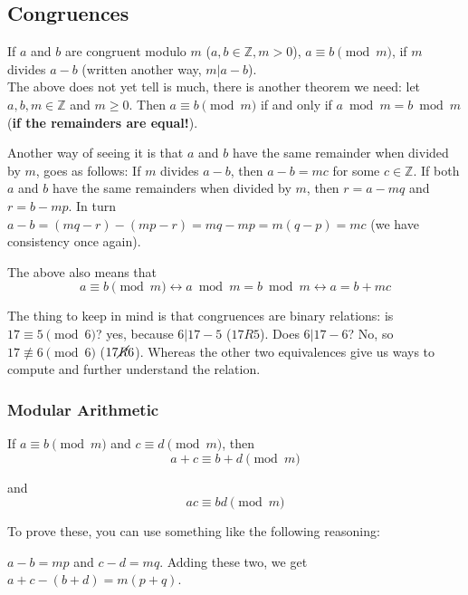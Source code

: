 \subsection{Congruences}

If $a$ and $b$ are congruent modulo $m$ ($a,b \in \mathbb{Z}, m >0$), $a \equiv b \pmod m$,
if $m$ divides $a-b$ (written another way, $m | a-b$).
\\

The above does not yet tell is much, there is another theorem we need:
let $a, b, m\in\mathbb{Z}$ and $m \geq 0$.
Then $a \equiv b \pmod m$ if and only if $a \bmod m = b \bmod m$
(\textbf{if the remainders are equal!}).

Another way of seeing it is that $a$ and $b$ have the same remainder when divided by $m$, goes as follows:
If $m$ divides $a-b$, then $a-b = mc$ for some $c \in\mathbb{Z}$.
If both $a$ and $b$ have the same remainders when divided by $m$, then
$r = a - mq$ and $r = b - mp$.
In turn $a-b = (mq - r) - (mp - r) = mq - mp = m(q-p) = mc$ (we have consistency once again).

The above also means that
$$
a \equiv b \pmod m  \leftrightarrow  a \bmod m = b \bmod m  \leftrightarrow  a = b + mc
$$

The thing to keep in mind is that congruences are binary relations: is $17 \equiv 5 \pmod 6$? yes, because $6|17-5$ ($17R5$).
Does $6|17-6$? No, so $17 \not\equiv 6 \pmod 6$ ($17\cancel{R}6$).
Whereas the other two equivalences give us ways to compute and further understand the relation.



\subsubsection{Modular Arithmetic}

If $a \equiv b \pmod m$ and $c \equiv d \pmod m$, then
\begin{equation}
    a + c \equiv b + d \pmod m
\end{equation}

and
\begin{equation}
    ac \equiv bd \pmod m
\end{equation}

To prove these, you can use something like the following reasoning:

$a - b = mp$ and $c - d = mq$.
Adding these two, we get $a + c - (b + d) = m(p+q)$.

